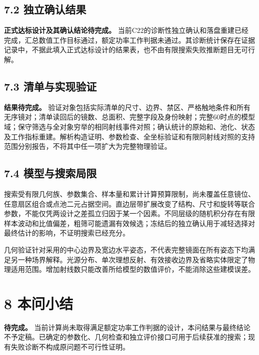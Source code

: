 \documentclass[UTF8,fontset=windows,zihao=-4]{ctexart}
\begin{document}
\subsection*{7.2 独立确认结果}

\textbf{正式达标设计及其确认结论待完成。} 当前C22的诊断性独立确认和落盘重建已经完成，汇总数值工作目标通过，额定功率工作判据未通过。其诊断统计保存在证据记录中，不据此填入正式达标设计的结果表，也不由有限搜索失败推断题目无可行解。

\subsection*{7.3 清单与实现验证}

\textbf{结果待完成。} 验证对象包括实际清单的尺寸、边界、禁区、严格触地条件和所有无序镜对；清单读回后的镜数、总面积、完整字段及身份映射；完整60时点的模型域；保守筛选与全对象穷举的相同射线事件对照；确认统计的原始和、池化、状态及工作指标重建。解析构造证明、参数检查、全坐标验证和有限同射线对照的支持范围分别报告，不将其中任一项扩大为完整物理验证。

\subsection*{7.4 模型与搜索局限}

搜索受有限几何族、参数集合、样本量和累计计算预算限制，尚未覆盖任意镜位、任意扇区组合或点池二元占据空间。直边层带扩展改变了结构、尺寸和旋转等联合参数，不能仅凭两设计之差孤立归因于某一个因素。不同层级的随机积分存在有限样本波动和比值偏差，粗筛可能遗漏有效候选；冻结后的独立确认用于减轻选择对最终估计的影响，不证明搜索已经充分。

几何验证针对采用的中心边界及宽边水平姿态，不代表完整镜面在所有姿态下均满足另一种场界解释。光源分布、单次理想反射、有效接收边界及省略实体限定了物理适用范围。增加射线数只能改善所给模型的数值评价，不能消除这些建模误差。

\section*{8 本问小结}

\textbf{待完成。} 当前计算尚未取得满足额定功率工作判据的设计，本问结果与最终结论不予定稿。已确定的参数化、几何检查和独立评价接口可用于后续获准的搜索；现有失败诊断不构成原问题不可行性证明。
\end{document}
